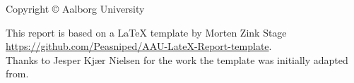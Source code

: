 \thispagestyle{empty}
{\small
\strut\vfill %
\noindent Copyright \copyright{} Aalborg University \mySemesterYear{}\\
\par
\noindent This report is based on a LaTeX template by Morten Zink Stage\\
\url{https://github.com/Peasniped/AAU-LateX-Report-template}.\\
Thanks to Jesper Kjær Nielsen for the work the template was initially adapted from.\par
\vspace{0.2cm}
\noindent \myColophon
}

\clearpage